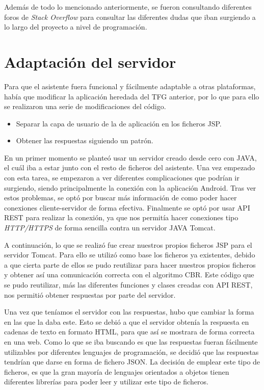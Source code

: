 Además de todo lo mencionado anteriormente, se fueron consultando diferentes foros de \textit{Stack Overflow} \cite{stack:info} para consultar las diferentes dudas que iban surgiendo a lo largo del proyecto a nivel de programación.

\section{Adaptación del servidor}

Para que el asistente fuera funcional y fácilmente adaptable a otras plataformas, había que modificar la aplicación heredada del TFG anterior, por lo que para ello se realizaron una serie de modificaciones del código.

\begin{itemize}
	\tightlist
	\item
	Separar la capa de usuario de la de aplicación en los ficheros JSP.
	\item 
	Obtener las respuestas siguiendo un patrón.
\end{itemize}

En un primer momento se planteó usar un servidor creado desde cero con JAVA, el cuál iba a estar junto con el resto de ficheros del asistente. Una vez empezado con esta tarea, se empezaron a ver diferentes complicaciones que podrían ir surgiendo, siendo principalmente la conexión con la aplicación Android. Tras ver estos problemas, se optó por buscar más información de como poder hacer conexiones cliente-servidor de forma efectiva. Finalmente se optó por usar API REST para realizar la conexión, ya que nos permitía hacer conexiones tipo \textit{HTTP/HTTPS} de forma sencilla contra un servidor JAVA Tomcat.

A continuación, lo que se realizó fue crear nuestros propios ficheros JSP para el servidor Tomcat. Para ello se utilizó como base los ficheros ya existentes, debido a que cierta parte de ellos se pudo reutilizar para hacer nuestros propios ficheros y obtener así una comunicación correcta con el algoritmo CBR. Este código que se pudo reutilizar, más las diferentes funciones y clases creadas con API REST, nos permitió obtener respuestas por parte del servidor.

Una vez que teníamos el servidor con las respuestas, hubo que cambiar la forma en las que la daba este. Esto se debió a que el servidor obtenía la respuesta en cadenas de texto en formato HTML, para que así se mostrara de forma correcta en una web. Como lo que se iba buscando es que las respuestas fueran fácilmente utilizables por diferentes lenguajes de programación, se decidió que las respuestas tendrían que darse en forma de fichero JSON. La decisión de emplear este tipo de ficheros, es que la gran mayoría de lenguajes orientados a objetos tienen diferentes librerías para poder leer y utilizar este tipo de ficheros.

